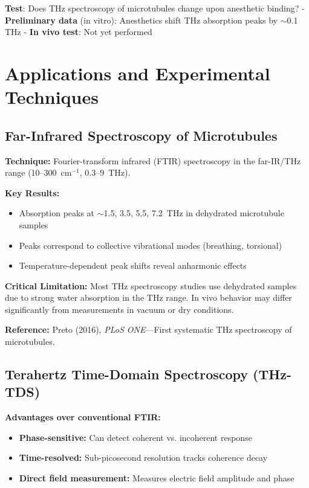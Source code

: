 \textbf{Test}: Does THz spectroscopy of microtubules change upon
anesthetic binding? - \textbf{Preliminary data} (in vitro): Anesthetics
shift THz absorption peaks by $\sim$0.1 THz - \textbf{In vivo
test}: Not yet performed




\section{Applications and Experimental Techniques}
\label{sec:applications}

\subsection{Far-Infrared Spectroscopy of Microtubules}
\label{subsec:app-ftir}

\textbf{Technique:} Fourier-transform infrared (FTIR) spectroscopy in the far-IR/THz range (10--300~cm$^{-1}$, 0.3--9~THz).

\textbf{Key Results:}
\begin{itemize}
\item Absorption peaks at $\sim$1.5, 3.5, 5.5, 7.2~THz in dehydrated microtubule samples
\item Peaks correspond to collective vibrational modes (breathing, torsional)
\item Temperature-dependent peak shifts reveal anharmonic effects
\end{itemize}

\begin{warningbox}
\textbf{Critical Limitation:} Most THz spectroscopy studies use dehydrated samples due to strong water absorption in the THz range. In vivo behavior may differ significantly from measurements in vacuum or dry conditions.
\end{warningbox}

\textbf{Reference:} Preto (2016), \textit{PLoS ONE}---First systematic THz spectroscopy of microtubules.

\subsection{Terahertz Time-Domain Spectroscopy (THz-TDS)}
\label{subsec:app-thz-tds}

\textbf{Advantages over conventional FTIR:}
\begin{itemize}
\item \textbf{Phase-sensitive:} Can detect coherent vs. incoherent response
\item \textbf{Time-resolved:} Sub-picosecond resolution tracks coherence decay
\item \textbf{Direct field measurement:} Measures electric field amplitude and phase
\end{itemize}

